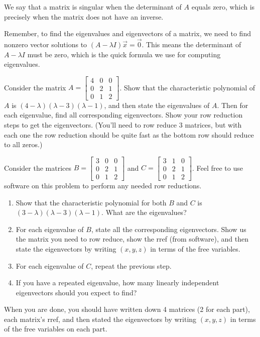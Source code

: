 \begin{definition}[Singular]
 We say that a matrix is singular when the determinant of $A$ equals zero, which is precisely when the matrix does not have an inverse. 
\end{definition}






\mysubsection{\ideaeig}

Remember, to find the eigenvalues and eigenvectors of a matrix, we need to find nonzero vector solutions to $(A-\lambda I)\vec x=\vec 0$. This means the determinant of $A-\lambda I$ must be zero, which is the quick formula we use for computing eigenvalues. 

\begin{problem}
Consider the matrix 
$
A=
\begin{bmatrix}
 4 & 0 & 0 \\
 0 & 2 & 1 \\
 0 & 1 & 2
\end{bmatrix}
$. 
Show that the characteristic polynomial of $A$ is $(4-\lambda)(\lambda-3)(\lambda -1)$, and then state the eigenvalues of $A$. 
Then for each eigenvalue, find all corresponding eigenvectors. Show your row reduction steps to get the eigenvectors. (You'll need to row reduce 3 matrices, but with each one the row reduction should be quite fast as the bottom row should reduce to all zeros.)
\end{problem}

\begin{problem}\label{First example of deficient eigenvalue}
Consider the matrices
$
B=
\begin{bmatrix}
 3 & 0 & 0 \\
 0 & 2 & 1 \\
 0 & 1 & 2
\end{bmatrix}
$ and 
$
C=
\begin{bmatrix}
 3 & 1 & 0 \\
 0 & 2 & 1 \\
 0 & 1 & 2
\end{bmatrix}
$.
Feel free to use software on this problem to perform any needed row reductions. 
\begin{enumerate}
\item Show that the characteristic polynomial for both $B$ and $C$ is $(3-\lambda)(\lambda-3)(\lambda -1)$.  What are the eigenvalues?
\item For each eigenvalue of $B$, state all the corresponding eigenvectors. Show us the matrix you need to row reduce, show the rref (from software), and then state the eigenvectors by writing $(x,y,z)$ in terms of the free variables.
\item For each eigenvalue of $C$, repeat the previous step.
\item If you have a repeated eigenvalue, how many linearly independent eigenvectors should you expect to find?
\end{enumerate}
When you are done, you should have written down 4 matrices (2 for each part), each matrix's rref, and then stated the eigenvectors by writing $(x,y,z)$ in terms of the free variables on each part.  
 \end{problem}




